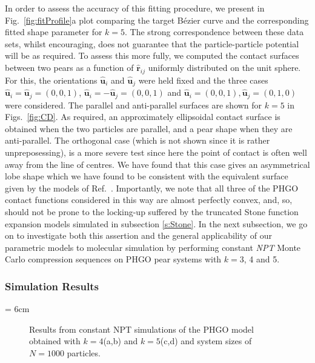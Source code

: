 \documentclass[%
reprint,
superscriptaddress,
showpacs,
 amsmath,amssymb,
 aps,
floatfix,
]{revtex4-1}
\newcommand{\vecth}[1]{ \mathbf{\hat{#1} } }
\newcommand{\picL}[1]{\texttt{[image: \#1]}}
\newlength{\picW}
\newcommand{\rij}{\vecth{r}_{ij}}
\newcommand{\ui}{\vecth{u}_i}
\newcommand{\uj}{\vecth{u}_j}
\begin{document}
In order to assess the accuracy of this fitting procedure, we present in
Fig.~\ref{fig:fitProfile}a plot comparing the target B\'{e}zier curve and the corresponding
fitted shape parameter for $k=5$. The strong correspondence between these data sets, whilst
encouraging, does not guarantee that the particle-particle potential will be as required. To
assess this more fully, we computed the contact surfaces between two pears as a function of
$\rij$ uniformly distributed on the unit sphere. For this, the orientations $\ui$ and $\uj$ were
held fixed and the three cases \mbox{$\ui=\uj=(0,0,1)$}, \mbox{$\ui = -\uj = (0,0,1)$} and
\mbox{$\ui = (0,0,1),\uj = (0,1,0)$} were considered. The parallel and anti-parallel surfaces
are shown for $k=5$ in Figs.~\ref{fig:CD}. As required, an approximately ellipsoidal contact
surface is obtained when the two particles are parallel, and a pear shape when they are
anti-parallel. The orthogonal case (which is not shown since it is rather unpreposessing), is a
more severe test since here the point of contact is often well away from the line of centres. We
have found that this case gives an asymmetrical lobe shape which we have found to be consistent
with the equivalent surface given by the models of Ref.~\cite{Berardi_Ricci_01}. Importantly, we
note that all three of the PHGO contact functions considered in this way are almost perfectly
convex, and, so, should not be prone to the locking-up suffered by the truncated Stone function expansion
models simulated in subsection \ref{s:Stone}. In the next subsection, we go on to investigate
both this assertion and the general applicability of our parametric models to molecular
simulation by performing constant {\em NPT} Monte Carlo compression sequences on PHGO pear
systems with $k=3$, 4 and 5.



\subsubsection{Simulation Results} \label{s:GBP_results}

\picW = 6cm
\begin{figure*}
    \centering
    \subfigure[$k=4$]{\picL{GBP_P-rho_k4.ps}}
    \subfigure[$k=4$]{\picL{GBP_P2-rho_k4.ps}}
    \subfigure[$k=5$]{\picL{GBP_P-rho_k5.ps}}
    \subfigure[$k=5$]{\picL{GBP_P2-rho_k5.ps}}
    \caption{Results from constant NPT simulations of the PHGO model obtained with $k=4$(a,b) and
    $k=5$(c,d) and system sizes of $N=1000$ particles.}
    \label{fig:phaseDia}
\end{figure*}
\end{document}
